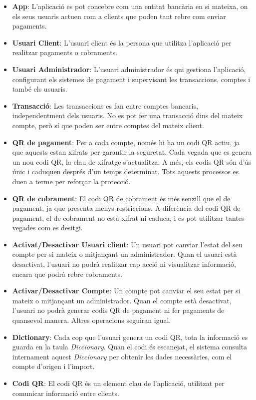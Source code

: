\documentclass[a4paper,12pt,twoside]{ThesisStyle}
\begin{document}
\begin{itemize}
    \item \textbf{App}: L'aplicació es pot concebre com una entitat bancària en si mateixa, on els seus usuaris actuen com a clients que poden tant rebre com enviar pagaments. 
    \item \textbf{Usuari Client}: L'usuari client és la persona que utilitza l'aplicació per realitzar pagaments o cobraments.
    \item \textbf{Usuari Administrador}: L'usuari administrador és qui gestiona l'aplicació, configurant els sistemes de pagament i supervisant les transaccions, comptes i també els usuaris.
    \item \textbf{Transacció}: Les transaccions es fan entre comptes bancaris, independentment dels usuaris. No es pot fer una transacció dins del mateix compte, però sí que poden ser entre comptes del mateix client.
    \item \textbf{QR de pagament}: Per a cada compte, només hi ha un codi QR actiu, ja que aquests estan xifrats per garantir la seguretat. Cada vegada que es genera un nou codi QR, la clau de xifratge s’actualitza. A més, els codis QR són d'ús únic i caduquen després d'un temps determinat. Tots aquests processos es duen a terme per reforçar la protecció.
    \item \textbf{QR de cobrament}: El codi QR de cobrament és més senzill que el de pagament, ja que presenta menys restriccions. A diferència del codi QR de pagament, el de cobrament no està xifrat ni caduca, i es pot utilitzar tantes vegades com es desitgi.
    \item \textbf{Activat/Desactivar Usuari client}: Un usuari pot canviar l'estat del seu compte per si mateix o mitjançant un administrador. Quan el usuari està desactivat, l'usuari no podrà realitzar cap acció ni visualitzar informació, encara que podrà rebre cobraments.
    \item \textbf{Activar/Desactivar Compte}: Un compte pot canviar el seu estat per si mateix o mitjançant un administrador. Quan el compte està desactivat, l'usuari no podrà generar codis QR de pagament ni fer pagaments de quansevol manera. Altres operacions seguiran igual.
    \item \textbf{Dictionary}: Cada cop que l’usuari genera un codi QR, tota la informació es guarda en la taula \textit{Diccionary}. Quan el codi és escanejat, el sistema consulta internament aquest \textit{Diccionary} per obtenir les dades necessàries, com el compte d’origen i l’import.
    \item \textbf{Codi QR}: El codi QR és un element clau de l'aplicació, utilitzat per comunicar informació entre clients.
\end{itemize}
\end{document}
